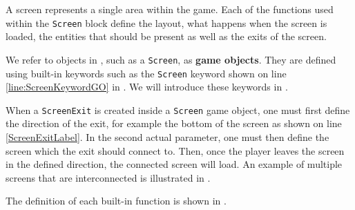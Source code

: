 A screen represents a single area within the game. Each of the functions used within the \texttt{Screen} block define the layout, what happens when the screen is loaded, the entities that should be present as well as the exits of the screen.

We refer to objects in \dazel{}, such as a \texttt{Screen}, as \textbf{game objects}.
They are defined using built-in keywords such as the \texttt{Screen} keyword shown on line \ref{line:ScreenKeywordGO} in .
We will introduce these keywords in .

When a \texttt{ScreenExit} is created inside a \texttt{Screen} game object, one must first define the direction of the exit, for example the bottom of the screen as shown on line \ref{ScreenExitLabel}.
In the second actual parameter, one must then define the screen which the exit should connect to.
Then, once the player leaves the screen in the defined direction, the connected screen will load. An example of multiple screens that are interconnected is illustrated in .


The definition of each built-in function is shown in .
